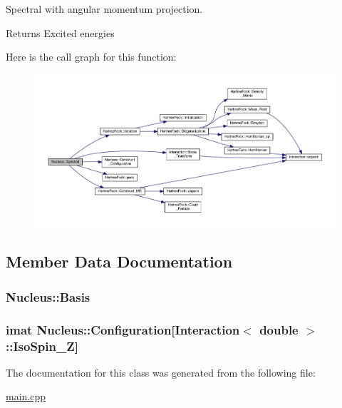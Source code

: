 Spectral with angular momentum projection. 

\begin{DoxyReturn}{Returns}
Excited energies 
\end{DoxyReturn}


Here is the call graph for this function\-:
\nopagebreak
\begin{figure}[H]
\begin{center}
\leavevmode
\includegraphics[width=350pt]{class_nucleus_a2f41a5f6ec0546ec57736d5f0bad6e17_cgraph}
\end{center}
\end{figure}




\subsection{Member Data Documentation}
\hypertarget{class_nucleus_a26891e375a90425a013eab9c7176f318}{
\subsubsection[{Basis}]{ Nucleus\-::\-Basis\hspace{0.3cm}{\ttfamily [private]}}}\label{class_nucleus_a26891e375a90425a013eab9c7176f318}
\hypertarget{class_nucleus_a0bca60cd6f52b789fa096d0f5ce2a75e}{
\subsubsection[{Configuration}]{\setlength{\rightskip}{0pt plus 5cm}imat Nucleus\-::\-Configuration\mbox{[}{\bf Interaction}$<$ double $>$\-::Iso\-Spin\-\_\-\-Z\mbox{]}\hspace{0.3cm}{\ttfamily [private]}}}\label{class_nucleus_a0bca60cd6f52b789fa096d0f5ce2a75e}


The documentation for this class was generated from the following file\-:\begin{DoxyCompactItemize}
\item 
\hyperlink{main_8cpp}{main.\-cpp}\end{DoxyCompactItemize}
